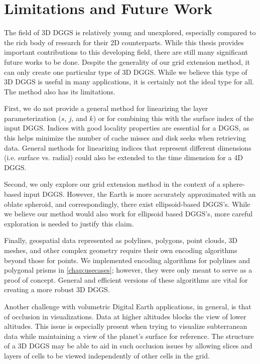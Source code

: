 \section{Limitations and Future Work}
The field of 3D DGGS is relatively young and unexplored, especially compared to the rich body of research for their 2D counterparts.
While this thesis provides important contributions to this developing field, there are still many significant future works to be done.
Despite the generality of our grid extension method, it can only create one particular type of 3D DGGS.
While we believe this type of 3D DGGS is useful in many applications, it is certainly not the ideal type for all.
The method also has its limitations.


First, we do not provide a general method for linearizing the layer parameterization ($s$, $j$, and $k$) or for combining this with the surface index of the input DGGS.
Indices with good locality properties are essential for a DGGS, as this helps minimize the number of cache misses and disk seeks when retrieving data.
General methods for linearizing indices that represent different dimensions (i.e. surface vs. radial) could also be extended to the time dimension for a 4D DGGS.


Second, we only explore our grid extension method in the context of a sphere-based input DGGS.
However, the Earth is more accurately approximated with an oblate spheroid, and correspondingly, there exist ellipsoid-based DGGS's.
While we believe our method would also work for ellipsoid based DGGS's, more careful exploration is needed to justify this claim.


Finally, geospatial data represented as polylines, polygons, point clouds, 3D meshes, and other complex geometry require their own encoding algorithms beyond those for points.
We implemented encoding algorithms for polylines and polygonal prisms in \cref{chap:usecases}; however, they were only meant to serve as a proof of concept.
General and efficient versions of these algorithms are vital for creating a more robust 3D DGGS.


Another challenge with volumetric Digital Earth applications, in general, is that of occlusion in visualizations.
Data at higher altitudes blocks the view of lower altitudes.
This issue is especially present when trying to visualize subterranean data while maintaining a view of the planet's surface for reference.
The structure of a 3D DGGS may be able to aid in such occlusion issues by allowing slices and layers of cells to be viewed independently of other cells in the grid.
